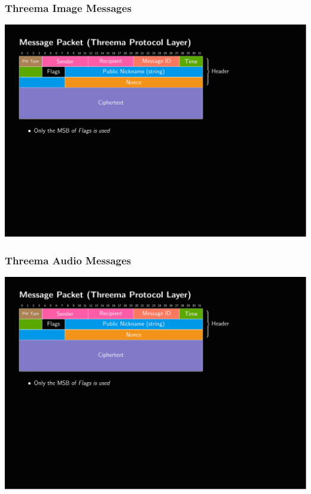 \documentclass[aspectratio=169]{beamer}
\begin{document}
\begin{frame}
	\frametitle{Threema Image Messages}
	\includegraphics[page=4,clip,trim={.99cm 7.5cm 3.2cm 1.8cm},width=\textwidth]{out/messages.pdf}
\end{frame}

\begin{frame}
	\frametitle{Threema Audio Messages}
	\includegraphics[page=5,clip,trim={.99cm 7.5cm 3.2cm 1.8cm},width=\textwidth]{out/messages.pdf}
\end{frame}
\end{document}
